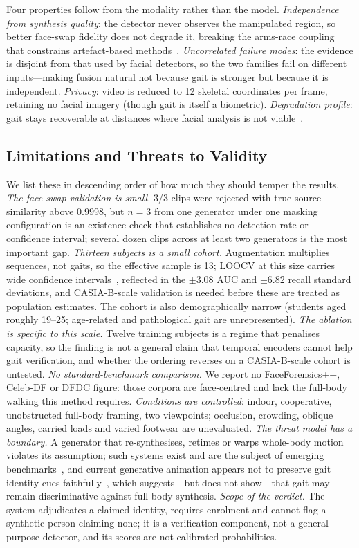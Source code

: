 \documentclass[conference]{IEEEtran}
\begin{document}
Four properties follow from the modality rather than the model.
\emph{Independence from synthesis quality}: the detector never observes the
manipulated region, so better face-swap fidelity does not degrade it, breaking
the arms-race coupling that constrains artefact-based
methods~\cite{recce,altfreezing}. \emph{Uncorrelated failure modes}: the
evidence is disjoint from that used by facial detectors, so the two families
fail on different inputs---making fusion natural not because gait is stronger
but because it is independent. \emph{Privacy}: video is reduced to 12 skeletal coordinates per frame, retaining no facial imagery (though gait is itself a biometric). \emph{Degradation profile}: gait stays recoverable at distances where facial analysis is not viable~\cite{forensic_gait}.

\subsection{Limitations and Threats to Validity}
\label{sec:threats}

We list these in descending order of how much they should temper the results.
\emph{The face-swap validation is small.} 3/3 clips were rejected with
true-source similarity above $0.9998$, but $n=3$ from one generator under one
masking configuration is an existence check that establishes no detection rate
or confidence interval; several dozen clips across at least two generators is the
most important gap. \emph{Thirteen subjects is a small cohort.} Augmentation
multiplies sequences, not gaits, so the effective sample is 13; LOOCV at this
size carries wide confidence intervals~\cite{varoquaux_small}, reflected in the
$\pm 3.08$ AUC and $\pm 6.82$ recall standard deviations, and CASIA-B-scale
validation is needed before these are treated as population estimates. The
cohort is also demographically narrow (students aged roughly 19--25;
age-related and pathological gait are unrepresented). \emph{The ablation is
specific to this scale.} Twelve training subjects is a regime that penalises
capacity, so the finding is not a general claim that temporal encoders cannot
help gait verification, and whether the ordering reverses on a CASIA-B-scale
cohort is untested. \emph{No standard-benchmark comparison.} We report no
FaceForensics++, Celeb-DF or DFDC figure: those corpora are face-centred and lack
the full-body walking this method requires. \emph{Conditions are controlled}:
indoor, cooperative, unobstructed full-body framing, two viewpoints; occlusion,
crowding, oblique angles, carried loads and varied footwear are unevaluated.
\emph{The threat model has a boundary.} A generator that re-synthesises, retimes
or warps whole-body motion violates its assumption; such systems exist and are
the subject of emerging benchmarks~\cite{ttdf,humanactionclips}, and current
generative animation appears not to preserve gait identity cues
faithfully~\cite{gaitfidelity}, which suggests---but does not show---that gait
may remain discriminative against full-body synthesis. \emph{Scope of the
verdict.} The system adjudicates a claimed identity, requires enrolment and
cannot flag a synthetic person claiming none; it is a verification component, not
a general-purpose detector, and its scores are not calibrated probabilities.
\end{document}
